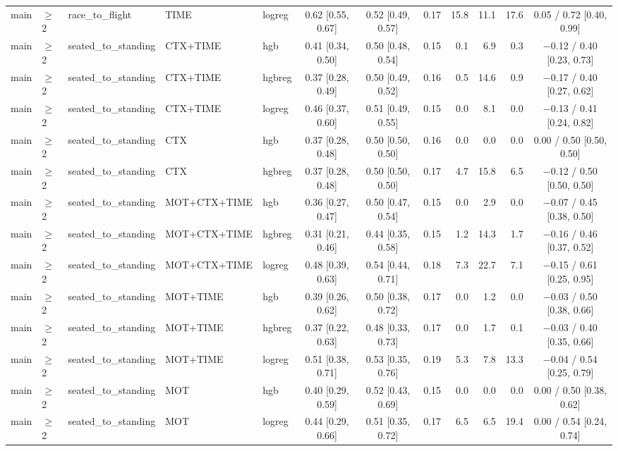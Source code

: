 \begin{longtable}{@{}lllllcccrrrc@{}}
main & $\geq$2 & race\_to\_flight & TIME & logreg & 0.62 [0.55, 0.67] & 0.52 [0.49, 0.57] & 0.17 & 15.8 & 11.1 & 17.6 & 0.05 / 0.72 [0.40, 0.99] \\
main & $\geq$2 & seated\_to\_standing & CTX+TIME & hgb & 0.41 [0.34, 0.50] & 0.50 [0.48, 0.54] & 0.15 & 0.1 & 6.9 & 0.3 & $-$0.12 / 0.40 [0.23, 0.73] \\
main & $\geq$2 & seated\_to\_standing & CTX+TIME & hgbreg & 0.37 [0.28, 0.49] & 0.50 [0.49, 0.52] & 0.16 & 0.5 & 14.6 & 0.9 & $-$0.17 / 0.40 [0.27, 0.62] \\
main & $\geq$2 & seated\_to\_standing & CTX+TIME & logreg & 0.46 [0.37, 0.60] & 0.51 [0.49, 0.55] & 0.15 & 0.0 & 8.1 & 0.0 & $-$0.13 / 0.41 [0.24, 0.82] \\
main & $\geq$2 & seated\_to\_standing & CTX & hgb & 0.37 [0.28, 0.48] & 0.50 [0.50, 0.50] & 0.16 & 0.0 & 0.0 & 0.0 & 0.00 / 0.50 [0.50, 0.50] \\
main & $\geq$2 & seated\_to\_standing & CTX & hgbreg & 0.37 [0.28, 0.48] & 0.50 [0.50, 0.50] & 0.17 & 4.7 & 15.8 & 6.5 & $-$0.12 / 0.50 [0.50, 0.50] \\
main & $\geq$2 & seated\_to\_standing & MOT+CTX+TIME & hgb & 0.36 [0.27, 0.47] & 0.50 [0.47, 0.54] & 0.15 & 0.0 & 2.9 & 0.0 & $-$0.07 / 0.45 [0.38, 0.50] \\
main & $\geq$2 & seated\_to\_standing & MOT+CTX+TIME & hgbreg & 0.31 [0.21, 0.46] & 0.44 [0.35, 0.58] & 0.15 & 1.2 & 14.3 & 1.7 & $-$0.16 / 0.46 [0.37, 0.52] \\
main & $\geq$2 & seated\_to\_standing & MOT+CTX+TIME & logreg & 0.48 [0.39, 0.63] & 0.54 [0.44, 0.71] & 0.18 & 7.3 & 22.7 & 7.1 & $-$0.15 / 0.61 [0.25, 0.95] \\
main & $\geq$2 & seated\_to\_standing & MOT+TIME & hgb & 0.39 [0.26, 0.62] & 0.50 [0.38, 0.72] & 0.17 & 0.0 & 1.2 & 0.0 & $-$0.03 / 0.50 [0.38, 0.66] \\
main & $\geq$2 & seated\_to\_standing & MOT+TIME & hgbreg & 0.37 [0.22, 0.63] & 0.48 [0.33, 0.73] & 0.17 & 0.0 & 1.7 & 0.1 & $-$0.03 / 0.40 [0.35, 0.66] \\
main & $\geq$2 & seated\_to\_standing & MOT+TIME & logreg & 0.51 [0.38, 0.71] & 0.53 [0.35, 0.76] & 0.19 & 5.3 & 7.8 & 13.3 & $-$0.04 / 0.54 [0.25, 0.79] \\
main & $\geq$2 & seated\_to\_standing & MOT & hgb & 0.40 [0.29, 0.59] & 0.52 [0.43, 0.69] & 0.15 & 0.0 & 0.0 & 0.0 & 0.00 / 0.50 [0.38, 0.62] \\
main & $\geq$2 & seated\_to\_standing & MOT & logreg & 0.44 [0.29, 0.66] & 0.51 [0.35, 0.72] & 0.17 & 6.5 & 6.5 & 19.4 & 0.00 / 0.54 [0.24, 0.74] \\

\end{longtable}
